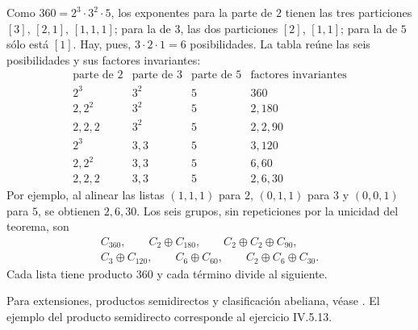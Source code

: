 \begin{ejem}
Como $360=2^3\cdot3^2\cdot5$, los exponentes para la parte de $2$ tienen las tres particiones $[3]$, $[2,1]$, $[1,1,1]$; para la de $3$, las dos particiones $[2]$, $[1,1]$; para la de $5$ sólo está $[1]$. Hay, pues, $3\cdot2\cdot1=6$ posibilidades. La tabla reúne las seis posibilidades y sus factores invariantes:
\[
\begin{array}{c|c|c|c}
\text{parte de }2&\text{parte de }3&\text{parte de }5&\text{factores invariantes}\\\hline
2^3&3^2&5&360\\
2,2^2&3^2&5&2,180\\
2,2,2&3^2&5&2,2,90\\
2^3&3,3&5&3,120\\
2,2^2&3,3&5&6,60\\
2,2,2&3,3&5&2,6,30
\end{array}
\]
Por ejemplo, al alinear las listas $(1,1,1)$ para $2$, $(0,1,1)$ para $3$ y $(0,0,1)$ para $5$, se obtienen $2,6,30$. Los seis grupos, sin repeticiones por la unicidad del teorema, son
\begin{gather*}
C_{360},\qquad C_2\oplus C_{180},\qquad C_2\oplus C_2\oplus C_{90},\\
C_3\oplus C_{120},\qquad C_6\oplus C_{60},\qquad C_2\oplus C_6\oplus C_{30}.
\end{gather*}
Cada lista tiene producto $360$ y cada término divide al siguiente.
\end{ejem}

\begin{obs}
Para extensiones, productos semidirectos y clasificación abeliana, véase \citet[cap.~IV, 5.1--3/5--13, 6.1--6 y ejemplo 6.8]{aluffi2009}. El ejemplo del producto semidirecto corresponde al ejercicio IV.5.13.
\end{obs}
